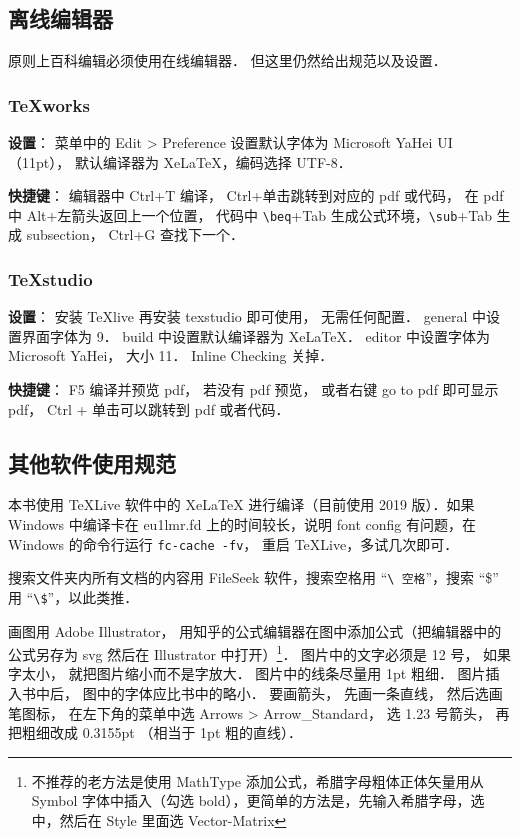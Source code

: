 
\subsection{离线编辑器}

原则上百科编辑必须使用在线编辑器． 但这里仍然给出规范以及设置．

\subsubsection{TeXworks}

\textbf{设置}： 菜单中的 Edit > Preference 设置默认字体为 Microsoft YaHei UI（11pt）， 默认编译器为 XeLaTeX，编码选择 UTF-8．

\textbf{快捷键}：
编辑器中 Ctrl+T 编译， 
Ctrl+单击跳转到对应的 pdf 或代码， 
在 pdf 中 Alt+左箭头返回上一个位置， 
代码中 \verb|\beq|+Tab 生成公式环境，\verb|\sub|+Tab 生成 subsection， Ctrl+G 查找下一个．

\subsubsection{TeXstudio}
\textbf{设置}： 安装 TeXlive 再安装 texstudio 即可使用， 无需任何配置．
general 中设置界面字体为 9．
build 中设置默认编译器为 XeLaTeX．
editor 中设置字体为 Microsoft YaHei， 大小 11．
Inline Checking 关掉．

\textbf{快捷键}：
F5 编译并预览 pdf， 若没有 pdf 预览， 或者右键 go to pdf 即可显示 pdf， Ctrl + 单击可以跳转到 pdf 或者代码．

\subsection{其他软件使用规范}
本书使用 TeXLive 软件中的 XeLaTeX 进行编译（目前使用 2019 版）．如果 Windows 中编译卡在 eu1lmr.fd 上的时间较长，说明 font config 有问题，在 Windows 的命令行运行 \verb|fc-cache -fv|， 重启 TeXLive，多试几次即可．

搜索文件夹内所有文档的内容用 FileSeek 软件，搜索空格用 “\verb|\ 空格|”，搜索 “\$” 用 “\verb|\$|”，以此类推．

画图用 Adobe Illustrator， 用知乎的公式编辑器在图中添加公式（把编辑器中的公式另存为 svg 然后在 Illustrator 中打开）\footnote{不推荐的老方法是使用 MathType 添加公式，希腊字母粗体正体矢量用从 Symbol 字体中插入（勾选 bold），更简单的方法是，先输入希腊字母，选中，然后在 Style 里面选 Vector-Matrix}． 图片中的文字必须是 12 号， 如果字太小， 就把图片缩小而不是字放大． 图片中的线条尽量用 1pt 粗细． 图片插入书中后， 图中的字体应比书中的略小． 要画箭头， 先画一条直线， 然后选画笔图标， 在左下角的菜单中选 Arrows > Arrow\_Standard， 选 1.23 号箭头， 再把粗细改成 0.3155pt （相当于 1pt 粗的直线）．

